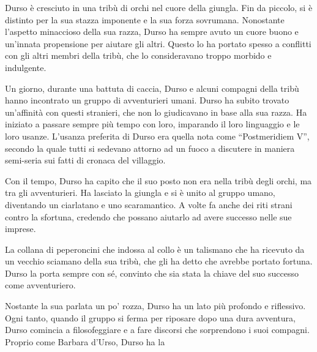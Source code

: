 Durso è cresciuto in una tribù di orchi nel cuore della giungla. Fin da
piccolo, si è distinto per la sua stazza imponente e la sua forza
sovrumana. Nonostante l'aspetto minaccioso della sua razza, Durso ha
sempre avuto un cuore buono e un'innata propensione per aiutare gli
altri. Questo lo ha portato spesso a conflitti con gli altri membri
della tribù, che lo consideravano troppo morbido e indulgente.

Un giorno, durante una battuta di caccia, Durso e alcuni compagni della
tribù hanno incontrato un gruppo di avventurieri umani. Durso ha subito
trovato un'affinità con questi stranieri, che non lo giudicavano in base
alla sua razza. Ha iniziato a passare sempre più tempo con loro,
imparando il loro linguaggio e le loro usanze. L'usanza preferita di
Durso era quella nota come ``Postmeridiem V'', secondo la quale tutti si
sedevano attorno ad un fuoco a discutere in maniera semi-seria sui fatti
di cronaca del villaggio.

Con il tempo, Durso ha capito che il suo posto non era nella tribù degli
orchi, ma tra gli avventurieri. Ha lasciato la giungla e si è unito al
gruppo umano, diventando un ciarlatano e uno scaramantico. A volte fa
anche dei riti strani contro la sfortuna, credendo che possano aiutarlo
ad avere successo nelle sue imprese.

La collana di peperoncini che indossa al collo è un talismano che ha
ricevuto da un vecchio sciamano della sua tribù, che gli ha detto che
avrebbe portato fortuna. Durso la porta sempre con sé, convinto che sia
stata la chiave del suo successo come avventuriero.

Nostante la sua parlata un po' rozza, Durso ha un lato più profondo e
riflessivo. Ogni tanto, quando il gruppo si ferma per riposare dopo una
dura avventura, Durso comincia a filosofeggiare e a fare discorsi che
sorprendono i suoi compagni. Proprio come Barbara d'Urso, Durso ha la
